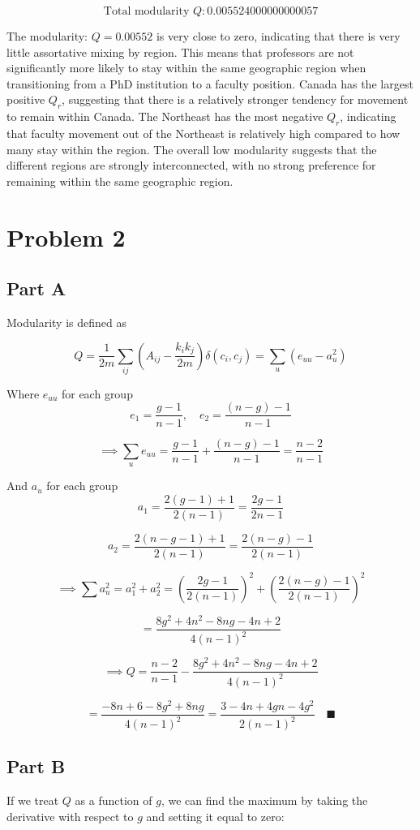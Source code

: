 \documentclass[12pt]{article}
\begin{document}
\[
 \text{Total modularity } Q: 0.005524000000000057
\]

The modularity: $Q = 0.00552$ is very close to zero, indicating that there is very little assortative mixing by region. This means that professors are not significantly more likely to stay within the same geographic region when transitioning from a PhD institution to a faculty position. Canada has the largest positive $Q_r$, suggesting that there is a relatively stronger tendency for movement to remain within Canada. The Northeast has the most negative $Q_r$, indicating that faculty movement out of the Northeast is relatively high compared to how many stay within the region. The overall low modularity suggests that the different regions are strongly interconnected, with no strong preference for remaining within the same geographic region.

\section*{Problem 2}

\subsection*{Part A}
Modularity is defined as

\[
Q = \frac{1}{2m}\sum_{ij}(A_{ij} - \frac{k_i k_j}{2m}) \delta(c_i, c_j) = \sum_u (e_{uu} - a_u^2)
\]

Where $e_{uu}$ for each group
\[
e_1 = \frac{g-1}{n-1}, \quad e_2 = \frac{(n-g) - 1}{n-1}
\] 

\[
\implies \sum_u e_{uu} = \frac{g-1}{n-1} + \frac{(n-g) - 1}{n-1} = \frac{n-2}{n-1}
\]

And $a_u$ for each group
\[
a_1 = \frac{2(g-1) +1}{2(n-1)} = \frac{2g-1}{2{n-1}}
\]

\[
a_2 = \frac{2(n-g-1)+1}{2(n-1)} = \frac{2(n-g)-1}{2(n-1)}
\]

\[
\implies \sum a_u^2 = a_1^2 + a_2^2 = \left( \frac{2g-1}{2(n-1)}\right) ^2 + \left( \frac{2(n-g)-1}{2(n-1)}\right) ^2
\]

\[
= \frac{8g^2 + 4n^2 - 8ng - 4n + 2}{4(n-1)^2} 
\]

\[
\implies Q = \frac{n-2}{n-1} - \frac{8g^2 + 4n^2 - 8ng - 4n + 2}{4(n-1)^2} 
\]


\[
= \frac{-8n + 6 -8g^2 + 8ng}{4(n-1)^2}  = \frac{3 - 4n + 4gn - 4g^2}{2(n - 1)^2} \quad \blacksquare
\]

\subsection*{Part B}
If we treat $Q$ as a function of $g$, we can find the maximum by taking the derivative with respect to $g$ and setting it equal to zero:
\end{document}
